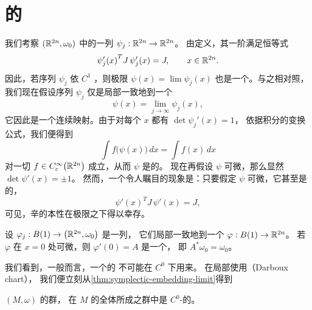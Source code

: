 
\section{\trSymplecticDiffeomorphism{}的\trRigidity}
\label{sec:symplectic-diffeo-rigidity}


我们考察 $(\mathbb{R}^{2n},\omega_0)$ 中的一列\trSymplecticDiffeomorphism{} $\psi_j:\mathbb{R}^{2n}\to\mathbb{R}^{2n}$。%
由定义，其一阶\trDerivative{}满足恒等式
\[
{\psi_j'(x)}^{T}J\,\psi_j'(x)=J,\qquad x\in\mathbb{R}^{2n}.
\]
因此，若序列 $\psi_j$ 依 $C^{1}$ \trConverge，则极限 $\psi(x)=\lim\psi_j(x)$%
也是一个\trSymplecticMapping。与之相对照，我们现在假设序列 $\psi_j$%
仅是局部一致地\trConverge{}到一个\trMapping
\[
\psi(x)=\lim_{j\to\infty}\psi_j(x),
\]
它因此是一个连续映射。由于对每个 $x$ 都有 $\det\psi_j'(x)=1$，%
依据积分的变换公式，我们便得到
\begin{equation}\label{eq:limit-measure-preserving}
\int f\bigl(\psi(x)\bigr)\,dx=\int f(x)\,dx
\end{equation}
对一切 $f\in C_c^{\infty}\bigl(\mathbb{R}^{2n}\bigr)$ 成立，从而 $\psi$ 是\trMeasurePreserving{}的。%
现在再假设 $\psi$ 可微，那么显然 $\det\psi'(x)=\pm1$。%
然而，一个令人瞩目的现象是：只要假定 $\psi$ 可微，它甚至是\trSymplectic{}的，
\[
{\psi'(x)}^{T}J\,\psi'(x)=J,
\]
可见，辛的本性在\trTopology{}极限之下得以幸存。

\begin{theorem}\label{thm:symplectic-embedding-limit}
设 $\varphi_j:B(1)\to\bigl(\mathbb{R}^{2n},\omega_0\bigr)$ 是一列\trSymplecticEmbedding，%
它们局部一致地\trConverge{}到一个\trMapping{} $\varphi:B(1)\to\mathbb{R}^{2n}$。%
若 $\varphi$ 在 $x=0$ 处可微，则 $\varphi'(0)=A$ 是一个\trSymplecticMapping，%
即 $A^{*}\omega_0=\omega_0$。
\end{theorem}

我们看到，一般而言，一个\trVolumePreserving{}的\trDiffeomorphism{}%
不可能在 $C^{0}$ \trTopology{}下用\trSymplecticDiffeomorphism{}来\trApproximation。%
在局部使用\textbf{\trDarboux\trChart}（Darboux chart），%
我们便立刻从\cref{thm:symplectic-embedding-limit}得到

\begin{theorem}\label{thm:sympl-diffeo-c0-closed}
\trCompact\trSymplecticManifold{} $(M,\omega)$ 的\trSymplecticDiffeomorphism{}群，%
在 $M$ 的全体\trDiffeomorphism{}所成之群中是 $C^{0}$-\trClosed{}的。
\end{theorem}

